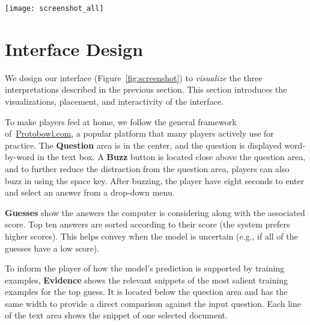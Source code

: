 \begin{figure*}[t]
\centering
\texttt{[image: screenshot\_all]}
\caption{\label{fig:screenshot} Screenshot of the interface. Question is
    displayed in the middle area word-by-word, with question highlights
    displayed in the same panel. Guesses are listed in the panel on the left.
    Evidence is in the panel below.}
\end{figure*}

\section{Interface Design}
\label{sec:design}

We design our \qb{} interface (Figure~\ref{fig:screenshot}) to
\emph{visualize} the three interpretations described in the previous
section. This section introduces the visualizations, placement, and
interactivity of the interface. 

To make \qb{} players feel at home, we follow the general framework
of~\url{Protobowl.com}, a popular \qb{} platform
that many
players actively use for practice.  The \textbf{Question} area is
in the center, and the question is displayed word-by-word in
the text box. A \textbf{Buzz} button is located close above the
question area, and to further reduce the distraction from the question
area, players can also buzz in using the space key. After buzzing, the
player have eight seconds to enter and select an answer from
a drop-down menu.

\begin{figure}[H]
\centering
{}
\end{figure}

\textbf{Guesses} show the answers the computer is considering along
with the associated score.  Top ten answers are sorted according to
their score (the system prefers higher scores).  This helps convey
when the model is uncertain (e.g., if all of the guesses have a low
score).

\begin{figure}[H]
\centering
{}
\end{figure}

To inform the player of how the model's prediction is supported by
training examples, \textbf{Evidence} shows the relevant snippets of
the most salient training examples for the top guess. It is located
below the question area and has the same width to provide a direct
comparison against the input question. Each line of the text area
shows the snippet of one selected document.

